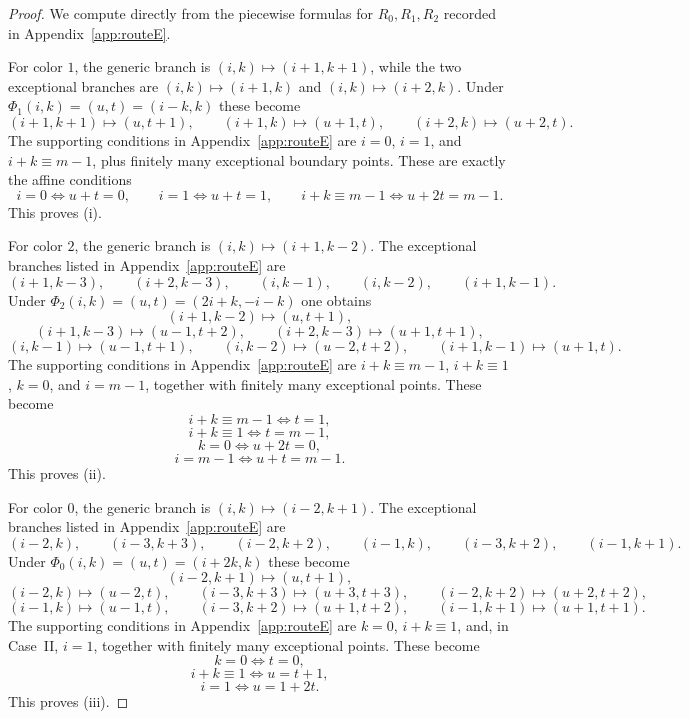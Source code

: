 \documentclass[11pt]{article}
\begin{document}
\begin{proof}
We compute directly from the piecewise formulas for $R_0,R_1,R_2$ recorded in Appendix~\ref{app:routeE}.

For color $1$, the generic branch is $(i,k)\mapsto(i+1,k+1)$, while the two exceptional branches are $(i,k)\mapsto(i+1,k)$ and $(i,k)\mapsto(i+2,k)$.
Under $\Phi_1(i,k)=(u,t)=(i-k,k)$ these become
\[
(i+1,k+1)\mapsto (u,t+1),\qquad (i+1,k)\mapsto (u+1,t),\qquad (i+2,k)\mapsto (u+2,t).
\]
The supporting conditions in Appendix~\ref{app:routeE} are $i=0$, $i=1$, and $i+k\equiv m-1$, plus finitely many exceptional boundary points.
These are exactly the affine conditions
\[
i=0 \iff u+t=0,\qquad i=1 \iff u+t=1,\qquad i+k\equiv m-1 \iff u+2t=m-1.
\]
This proves \textup{(i)}.

For color $2$, the generic branch is $(i,k)\mapsto(i+1,k-2)$.
The exceptional branches listed in Appendix~\ref{app:routeE} are
\[
(i+1,k-3),\qquad (i+2,k-3),\qquad (i,k-1),\qquad (i,k-2),\qquad (i+1,k-1).
\]
Under $\Phi_2(i,k)=(u,t)=(2i+k,-i-k)$ one obtains
\[
(i+1,k-2)\mapsto (u,t+1),
\]
\[
(i+1,k-3)\mapsto (u-1,t+2),\qquad (i+2,k-3)\mapsto (u+1,t+1),
\]
\[
(i,k-1)\mapsto (u-1,t+1),\qquad (i,k-2)\mapsto (u-2,t+2),\qquad (i+1,k-1)\mapsto (u+1,t).
\]
The supporting conditions in Appendix~\ref{app:routeE} are $i+k\equiv m-1$, $i+k\equiv 1$, $k=0$, and $i=m-1$, together with finitely many exceptional points.
These become
\[
i+k\equiv m-1 \iff t=1,
\]
\[
i+k\equiv 1 \iff t=m-1,
\]
\[
k=0 \iff u+2t=0,
\]
\[
i=m-1 \iff u+t=m-1.
\]
This proves \textup{(ii)}.

For color $0$, the generic branch is $(i,k)\mapsto(i-2,k+1)$.
The exceptional branches listed in Appendix~\ref{app:routeE} are
\[
(i-2,k),\qquad (i-3,k+3),\qquad (i-2,k+2),\qquad (i-1,k),\qquad (i-3,k+2),\qquad (i-1,k+1).
\]
Under $\Phi_0(i,k)=(u,t)=(i+2k,k)$ these become
\[
(i-2,k+1)\mapsto (u,t+1),
\]
\[
(i-2,k)\mapsto (u-2,t),\qquad (i-3,k+3)\mapsto (u+3,t+3),\qquad (i-2,k+2)\mapsto (u+2,t+2),
\]
\[
(i-1,k)\mapsto (u-1,t),\qquad (i-3,k+2)\mapsto (u+1,t+2),\qquad (i-1,k+1)\mapsto (u+1,t+1).
\]
The supporting conditions in Appendix~\ref{app:routeE} are $k=0$, $i+k\equiv 1$, and, in Case~II, $i=1$, together with finitely many exceptional points.
These become
\[
k=0 \iff t=0,
\]
\[
i+k\equiv 1 \iff u=t+1,
\]
\[
i=1 \iff u=1+2t.
\]
This proves \textup{(iii)}.
\end{proof}
\end{document}
